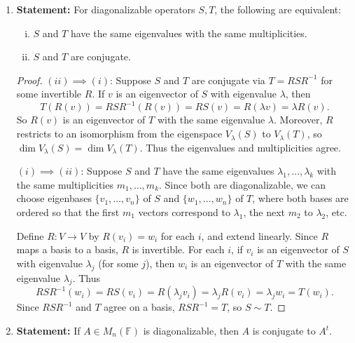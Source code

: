 \documentclass{article}
\begin{document}
\begin{enumerate}[(a)]
\begin{enumerate}[1.]
            \item \textbf{Statement:} For diagonalizable operators $S, T$, the following are equivalent:
            \begin{enumerate}[i)]
                \item $S$ and $T$ have the same eigenvalues with the same multiplicities.
                \item $S$ and $T$ are conjugate.
            \end{enumerate}
            
            \begin{proof}
                $(ii) \implies (i)$: Suppose $S$ and $T$ are conjugate via $T = R S R^{-1}$ for some invertible $R$. If $v$ is an eigenvector of $S$ with eigenvalue $\lambda$, then
                \[
                    T(R(v)) = R S R^{-1}(R(v)) = R S(v) = R(\lambda v) = \lambda R(v).
                \]
                So $R(v)$ is an eigenvector of $T$ with the same eigenvalue $\lambda$. Moreover, $R$ restricts to an isomorphism from the eigenspace $V_\lambda(S)$ to $V_\lambda(T)$, so $\dim V_\lambda(S) = \dim V_\lambda(T)$. Thus the eigenvalues and multiplicities agree.
                
                $(i) \implies (ii)$: Suppose $S$ and $T$ have the same eigenvalues $\lambda_1, \ldots, \lambda_k$ with the same multiplicities $m_1, \ldots, m_k$. Since both are diagonalizable, we can choose eigenbases $\{v_1, \ldots, v_n\}$ of $S$ and $\{w_1, \ldots, w_n\}$ of $T$, where both bases are ordered so that the first $m_1$ vectors correspond to $\lambda_1$, the next $m_2$ to $\lambda_2$, etc.
                
                Define $R: V \to V$ by $R(v_i) = w_i$ for each $i$, and extend linearly. Since $R$ maps a basis to a basis, $R$ is invertible. For each $i$, if $v_i$ is an eigenvector of $S$ with eigenvalue $\lambda_j$ (for some $j$), then $w_i$ is an eigenvector of $T$ with the same eigenvalue $\lambda_j$. Thus
                \[
                    R S R^{-1}(w_i) = R S(v_i) = R(\lambda_j v_i) = \lambda_j R(v_i) = \lambda_j w_i = T(w_i).
                \]
                Since $R S R^{-1}$ and $T$ agree on a basis, $R S R^{-1} = T$, so $S \sim T$.
            \end{proof}
            
            \item \textbf{Statement:} If $A \in M_n(\mathbb{F})$ is diagonalizable, then $A$ is conjugate to $A^t$.
            

\end{enumerate}
\end{enumerate}
\end{document}

